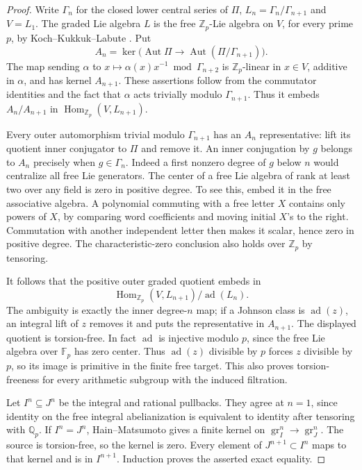 \begin{proof}
Write $\Gamma_n$ for the closed lower central series of $\Pi$,
$L_n=\Gamma_n/\Gamma_{n+1}$ and $V=L_1$. The graded Lie algebra
$L$ is the free $\mathbb Z_p$-Lie algebra on $V$, for every prime
$p$, by Koch--Kukkuk--Labute \cite[Theorem~2.1, pp.~48--49;
author PDF pp.~4--5]{KochKukkukLabute1998}.
Put
\[
 A_n=\ker\bigl(\operatorname{Aut}\Pi\longrightarrow
                    \operatorname{Aut}(\Pi/\Gamma_{n+1})\bigr).
\]
The map sending $\alpha$ to
$x\mapsto\alpha(x)x^{-1}\bmod\Gamma_{n+2}$ is
$\mathbb Z_p$-linear in $x\in V$, additive in $\alpha$, and has
kernel $A_{n+1}$. These assertions follow from the commutator
identities and the fact that $\alpha$ acts trivially modulo
$\Gamma_{n+1}$. Thus it embeds $A_n/A_{n+1}$ in
$\operatorname{Hom}_{\mathbb Z_p}(V,L_{n+1})$.

Every outer automorphism trivial modulo $\Gamma_{n+1}$ has an
$A_n$ representative: lift its quotient inner conjugator to
$\Pi$ and remove it. An inner conjugation by $g$ belongs to
$A_n$ precisely when $g\in\Gamma_n$. Indeed a first nonzero
degree of $g$ below $n$ would centralize all free Lie generators.
The center of a free Lie algebra of rank at least two over any
field is zero in positive degree. To see this, embed it in the
free associative algebra. A polynomial commuting with a free
letter $X$ contains only powers of $X$, by comparing word
coefficients and moving initial $X$'s to the right. Commutation
with another independent letter then makes it scalar, hence zero
in positive degree. The characteristic-zero conclusion also
holds over $\mathbb Z_p$ by tensoring.

It follows that the positive outer graded quotient embeds in
\[
 \operatorname{Hom}_{\mathbb Z_p}(V,L_{n+1})/\operatorname{ad}(L_n).
\]
The ambiguity is exactly the inner degree-$n$ map; if a Johnson
class is $\operatorname{ad}(z)$, an integral lift of $z$ removes
it and puts the representative in $A_{n+1}$. The displayed
quotient is torsion-free. In fact $\operatorname{ad}$ is injective
modulo $p$, since the free Lie algebra over $\mathbb F_p$ has zero
center. Thus $\operatorname{ad}(z)$ divisible by $p$ forces $z$
divisible by $p$, so its image is primitive in the finite free
target. This also proves torsion-freeness for every arithmetic
subgroup with the induced filtration.

Let $I^n\subseteq J^n$ be the integral and rational pullbacks.
They agree at $n=1$, since identity on the free integral
abelianization is equivalent to identity after tensoring with
$\mathbb Q_p$. If $I^n=J^n$, Hain--Matsumoto
\cite[Proposition~8.2, p.~25]{HainMatsumoto2001} gives a finite
kernel on $\operatorname{gr}_I^n\to\operatorname{gr}_J^n$.
The source is torsion-free, so the kernel is zero. Every element
of $J^{n+1}\subset I^n$ maps to that kernel and is in $I^{n+1}$.
Induction proves the asserted exact equality.
\end{proof}

